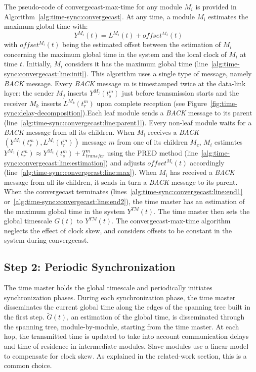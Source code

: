 The pseudo-code of convergecast-max-time for any module $M_i$ is provided in Algorithm~\ref{alg:time-sync:convergecast}. At any time, a module $M_i$ estimates the maximum global time with:
\begin{equation}
Y^{M_i}(t) = L^{M_i}(t) + offset^{M_i}(t)
\end{equation}
with $offset^{M_i}(t)$ being the estimated offset between the estimation of ${M_i}$ concerning the maximum global time in the system and the local clock of ${M_i}$ at time $t$. Initially, ${M_i}$ considers it has the maximum global time (line~\ref{alg:time-sync:convergecast:line:init}). This algorithm uses a single type of message, namely \textit{BACK} message. Every \textit{BACK} message $m$ is timestamped twice at the data-link layer: the sender ${M_j}$ inserts $Y^{M_j}(t_s^{m})$ just before transmission starts and the receiver ${M_k}$ inserts $L^{M_k}(t_r^{m})$ upon complete reception (see Figure~\ref{fig:time-sync:delay-decomposition}).Each leaf module sends a \textit{BACK} message to its parent (line~\ref{alg:time-sync:convergecast:line:parent1}). Every non-leaf module waits for a \textit{BACK} message from all its children. When ${M_i}$ receives a \textit{BACK}$(Y^{M_c}(t_s^{m}),L^{M_i}(t_r^{m}))$ message $m$ from one of its children $M_c$, $M_i$ estimates $Y^{M_c}(t_r^{m}) \approx Y^{M_c}(t_s^{m}) + T_{transfer}^m$ using the PRED method (line~\ref{alg:time-sync:convergecast:line:estimation}) and adjusts $offset^{M_i}(t)$ accordingly (line~\ref{alg:time-sync:convergecast:line:max}). When ${M_i}$ has received a \textit{BACK} message from all its children, it sends in turn a \textit{BACK} message to its parent. When the convergecast terminates (lines~\ref{alg:time-sync:convergecast:line:end1} or~\ref{alg:time-sync:convergecast:line:end2}), the time master has an estimation of the maximum global time in the system $Y^{\mathrm{\textit{TM}}}(t)$. The time master then sets the global timescale $G(t)$ to $Y^{\mathrm{\textit{TM}}}(t)$. The convergecast-max-time algorithm neglects the effect of clock skew, and considers offsets to be constant in the system during convergecast.

\subsection{Step 2: Periodic Synchronization}

The time master holds the global timescale and periodically initiates synchronization phases. During each synchronization phase, the time master disseminates the current global time along the edges of the spanning tree built in the first step. $\tilde{G}(t)$, an estimation of the global time, is disseminated through the spanning tree, module-by-module, starting from the time master. At each hop, the transmitted time is updated to take into account communication delays and time of residence in intermediate modules. Slave modules use a linear model to compensate for clock skew. As explained in the related-work section, this is a common choice.

